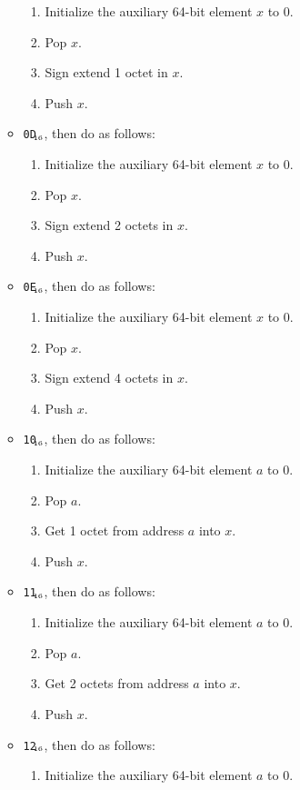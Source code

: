 \documentclass[a4paper,12pt]{article}
\newcommand{\num}[1]{\texttt{#1}\xspace}
\newcommand{\hex}[1]{\num{#1}$_{\textup{\tiny\hskip-1ex 16}}$\xspace}
\newcommand{\op}[1]{#1}
\newcommand{\SIGXS}     [1]{\op{\hex{0D}}}
\newcommand{\SIGXI}     [1]{\op{\hex{0E}}}
\newcommand{\LOADB}     [1]{\op{\hex{10}}}
\newcommand{\LOADS}     [1]{\op{\hex{11}}}
\newcommand{\LOADI}     [1]{\op{\hex{12}}}
\begin{document}
\begin{enumerate}
\begin{itemize}
    \begin{enumerate}
    \item Initialize the auxiliary 64-bit element $x$ to 0.
    \item Pop $x$.
    \item Sign extend 1 octet in $x$.
    \item Push $x$.
    \end{enumerate}
  \item \SIGXS{}, then do as follows:
    \begin{enumerate}
    \item Initialize the auxiliary 64-bit element $x$ to 0.
    \item Pop $x$.
    \item Sign extend 2 octets in $x$.
    \item Push $x$.
    \end{enumerate}
  \item \SIGXI{}, then do as follows:
    \begin{enumerate}
    \item Initialize the auxiliary 64-bit element $x$ to 0.
    \item Pop $x$.
    \item Sign extend 4 octets in $x$.
    \item Push $x$.
    \end{enumerate}
  \item \LOADB{}, then do as follows:
    \begin{enumerate}
    \item Initialize the auxiliary 64-bit element $a$ to 0.
    \item Pop $a$.
    \item Get 1 octet from address $a$ into $x$.
    \item Push $x$.
    \end{enumerate}
  \item \LOADS{}, then do as follows:
    \begin{enumerate}
    \item Initialize the auxiliary 64-bit element $a$ to 0.
    \item Pop $a$.
    \item Get 2 octets from address $a$ into $x$.
    \item Push $x$.
    \end{enumerate}
  \item \LOADI{}, then do as follows:
    \begin{enumerate}
    \item Initialize the auxiliary 64-bit element $a$ to 0.

\end{enumerate}
\end{itemize}
\end{enumerate}
\end{document}
